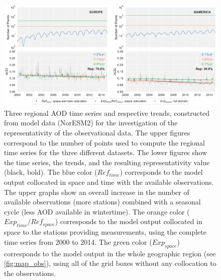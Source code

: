 \documentclass[acp, manuscript]{copernicus}
\begin{document}
\clearpage
\begin{figure}[t]
 \includegraphics[width=16cm]{Figures/Figure4.png}
 \caption{Three regional AOD time series and respective trends,  constructed from model data (NorESM2) for the investigation of the representativity of the observational data. The upper figures correspond to the number of points used to compute the regional time series for the three different datasets. The lower figures show the time series, the trends, and the resulting representativity value (black, bold). The blue color ($Ref_{time}$) corresponds to the model output collocated in space and time with the available observations. The upper graphs show an overall increase in the number of available observations (more stations) combined with a seasonal cycle (less AOD available in wintertime). The orange color ($Exp_{time}/Ref_{space}$) corresponds to the model output collocated in space to the stations providing measurements, using the complete time series from 2000 to 2014. The green color ($Exp_{space}$) corresponds to the model output in the whole geographic region (see \ref{fig:map_obs}), using all of the grid boxes without any collocation to the observations.}
 \label{fig:representativity}
\end{figure}
\end{document}
